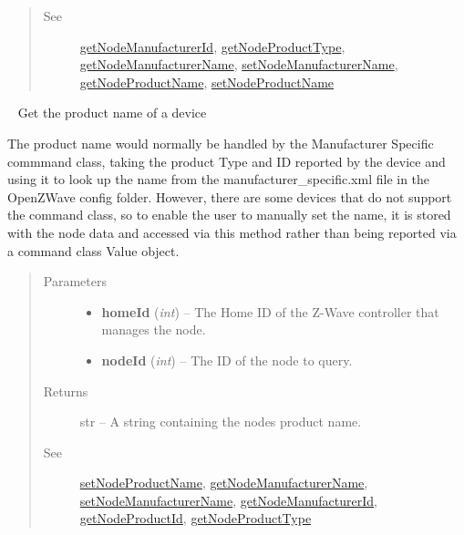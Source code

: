 \documentclass[letterpaper,10pt,english]{sphinxmanual}
\begin{document}
\begin{fulllineitems}
\begin{fulllineitems}
\begin{quote}
\begin{description}
\item[{See}] \leavevmode
{\hyperref[libopenzwave:getnodemanufacturerid]{getNodeManufacturerId}}, {\hyperref[libopenzwave:getnodeproducttype]{getNodeProductType}}, {\hyperref[libopenzwave:getnodemanufacturername]{getNodeManufacturerName}}, {\hyperref[libopenzwave:setnodemanufacturername]{setNodeManufacturerName}}, {\hyperref[libopenzwave:getnodeproductname]{getNodeProductName}}, {\hyperref[libopenzwave:setnodeproductname]{setNodeProductName}}

\end{description}\end{quote}

\end{fulllineitems}


\begin{fulllineitems}
\label{libopenzwave:libopenzwave.PyManager.getNodeProductName}~\label{libopenzwave:getnodeproductname}
Get the product name of a device

The product name would normally be handled by the Manufacturer Specific
commmand class, taking the product Type and ID reported by the device and using
it to look up the name from the manufacturer\_specific.xml file in the OpenZWave
config folder.  However, there are some devices that do not support the command
class, so to enable the user to manually set the name, it is stored with the
node data and accessed via this method rather than being reported via a command
class Value object.
\begin{quote}\begin{description}
\item[{Parameters}] \leavevmode\begin{itemize}
\item {} 
\textbf{homeId} (\emph{int}) -- The Home ID of the Z-Wave controller that manages the node.

\item {} 
\textbf{nodeId} (\emph{int}) -- The ID of the node to query.

\end{itemize}

\item[{Returns}] \leavevmode
str -- A string containing the nodes product name.

\item[{See}] \leavevmode
{\hyperref[libopenzwave:setnodeproductname]{setNodeProductName}}, {\hyperref[libopenzwave:getnodemanufacturername]{getNodeManufacturerName}}, {\hyperref[libopenzwave:setnodemanufacturername]{setNodeManufacturerName}},     {\hyperref[libopenzwave:getnodemanufacturerid]{getNodeManufacturerId}}, {\hyperref[libopenzwave:getnodeproductid]{getNodeProductId}}, {\hyperref[libopenzwave:getnodeproducttype]{getNodeProductType}}


\end{description}
\end{quote}
\end{fulllineitems}
\end{fulllineitems}
\end{document}
